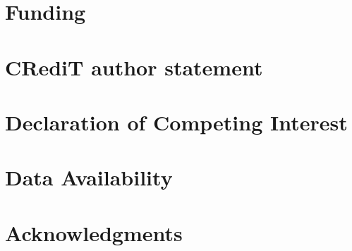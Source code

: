 \documentclass[preprint, authoryear]{elsarticle}
\begin{document}
\section*{Funding}


\section*{CRediT author statement}

\section*{Declaration of Competing Interest}

\section*{Data Availability}

\section*{Acknowledgments}


\end{document}

